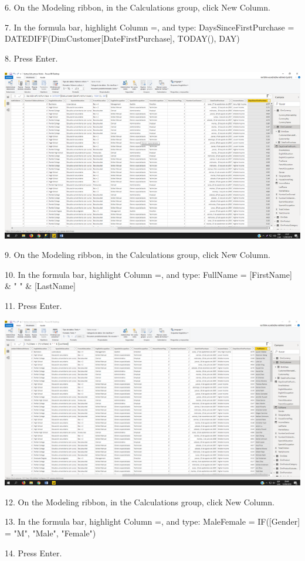 \item 6. On the Modeling ribbon, in the Calculations group, click New Column.
\item 7. In the formula bar, highlight Column =, and type:
DaysSinceFirstPurchase = DATEDIFF(DimCustomer[DateFirstPurchase], TODAY(), DAY)
\item 8. Press Enter. 
\begin{center}
\includegraphics[width=15cm]{./Imagenes/img25} 
\end{center}

\item 9. On the Modeling ribbon, in the Calculations group, click New Column.
\item 10. In the formula bar, highlight Column =, and type:
FullName = [FirstName] & " " & [LastName]
\item 11. Press Enter.
\begin{center}
\includegraphics[width=15cm]{./Imagenes/img26} 
\end{center}

\item 12. On the Modeling ribbon, in the Calculations group, click New Column.
\item 13. In the formula bar, highlight Column =, and type: 
MaleFemale = IF([Gender] = "M", "Male", "Female")
\item 14. Press Enter.

